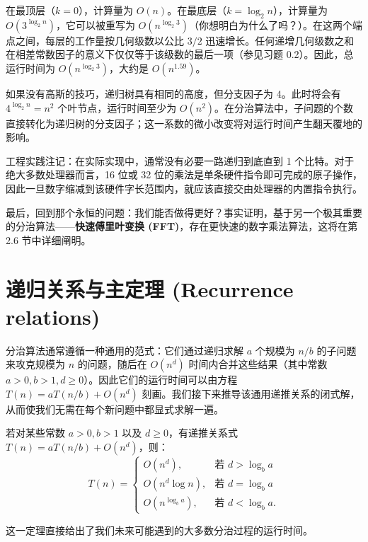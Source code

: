 在最顶层（$k = 0$），计算量为 $O(n)$。在最底层（$k = \log_2 n$），计算量为 $O(3^{\log_2 n})$，它可以被重写为 $O(n^{\log_2 3})$（你想明白为什么了吗？）。在这两个端点之间，每层的工作量按几何级数以公比 $3/2$ 迅速增长。任何递增几何级数之和在相差常数因子的意义下仅仅等于该级数的最后一项（参见习题 0.2）。因此，总运行时间为 $O(n^{\log_2 3})$，大约是 $O(n^{1.59})$。

如果没有高斯的技巧，递归树具有相同的高度，但分支因子为 4。此时将会有 $4^{\log_2 n} = n^2$ 个叶节点，运行时间至少为 $O(n^2)$。在分治算法中，子问题的个数直接转化为递归树的分支因子；这一系数的微小改变将对运行时间产生翻天覆地的影响。

工程实践注记：在实际实现中，通常没有必要一路递归到底直到 1 个比特。对于绝大多数处理器而言，16 位或 32 位的乘法是单条硬件指令即可完成的原子操作，因此一旦数字缩减到该硬件字长范围内，就应该直接交由处理器的内置指令执行。

最后，回到那个永恒的问题：我们能否做得更好？事实证明，基于另一个极其重要的分治算法——\textbf{快速傅里叶变换 (FFT)}，存在更快速的数字乘法算法，这将在第 2.6 节中详细阐明。

\section{递归关系与主定理 (Recurrence relations)}

分治算法通常遵循一种通用的范式：它们通过递归求解 $a$ 个规模为 $n/b$ 的子问题来攻克规模为 $n$ 的问题，随后在 $O(n^d)$ 时间内合并这些结果（其中常数 $a > 0, b > 1, d \ge 0$）。因此它们的运行时间可以由方程 $T(n) = aT(n/b) + O(n^d)$ 刻画。我们接下来推导该通用递推关系的闭式解，从而使我们无需在每个新问题中都显式求解一遍。

\begin{theorem}
若对某些常数 $a > 0, b > 1$ 以及 $d \ge 0$，有递推关系式 $T(n) = aT(n/b) + O(n^d)$，则：
\[
T(n) = \begin{cases}
O(n^d), & \text{若 } d > \log_b a \\
O(n^d \log n), & \text{若 } d = \log_b a \\
O(n^{\log_b a}), & \text{若 } d < \log_b a.
\end{cases}
\]
\end{theorem}
这一定理直接给出了我们未来可能遇到的大多数分治过程的运行时间。

